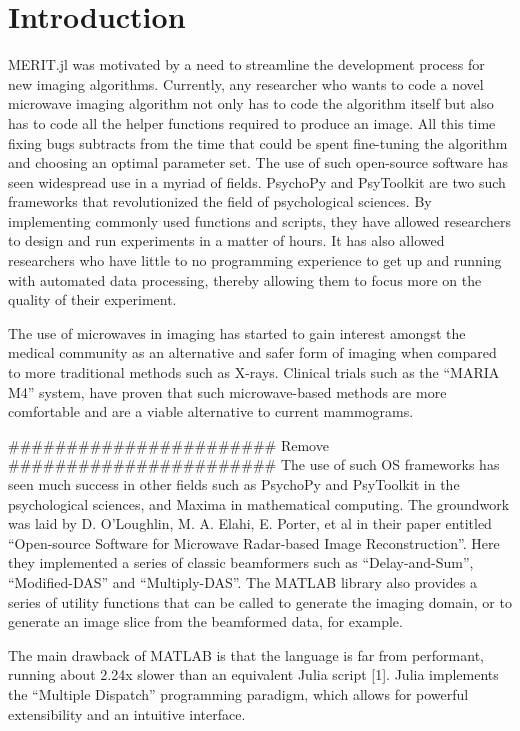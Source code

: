 \chapter{Introduction}
MERIT.jl was motivated by a need to streamline the development process for new imaging algorithms. Currently, any
researcher who wants to code a novel microwave imaging algorithm not only has to code the algorithm itself but also has
to code all the helper functions required to produce an image. All this time fixing bugs subtracts from the time that could
be spent fine-tuning the algorithm and choosing an optimal parameter set. The use of such open-source software has seen
widespread use in a myriad of fields. PsychoPy and PsyToolkit are two such frameworks that revolutionized the field of
psychological sciences. By implementing commonly used functions and scripts, they have allowed researchers to design and
run experiments in a matter of hours. It has also allowed researchers who have little to no programming experience
to get up and running with automated data processing, thereby allowing them to focus more on the quality of their
experiment. \cite{stoetPsyToolkitTestimonials} \hfill \break

The use of microwaves in imaging has started to gain interest amongst the medical community as an alternative and safer
form of imaging when compared to more traditional methods such as X-rays. Clinical trials such as the ``MARIA M4''
system, have proven that such microwave-based methods are more comfortable and are a viable alternative to current
mammograms.   






####################### Remove #######################
The use of such OS frameworks has seen much success in other fields such as PsychoPy and PsyToolkit in the psychological
sciences, and Maxima in mathematical computing. The groundwork was laid by D. O’Loughlin, M. A. Elahi, E. Porter, et al
in their paper entitled “Open-source Software for Microwave Radar-based Image Reconstruction”. Here they implemented a
series of classic beamformers such as “Delay-and-Sum”, “Modified-DAS” and “Multiply-DAS”. The MATLAB library also
provides a series of utility functions that can be called to generate the imaging domain, or to generate an image slice
from the beamformed data, for example. 

The main drawback of MATLAB is that the language is far from performant, running about 2.24x slower than an equivalent
Julia script [1]. Julia implements the “Multiple Dispatch” programming paradigm, which allows for powerful extensibility
and an intuitive interface.

